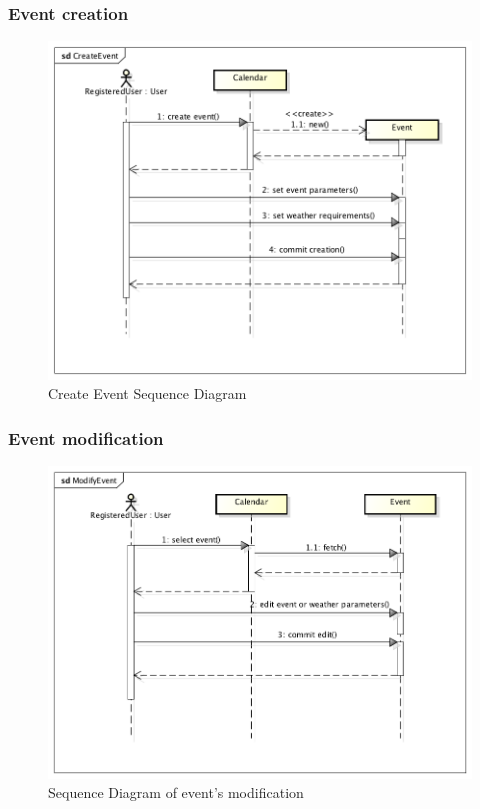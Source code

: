 \subsubsection{Event creation}
\begin{center}
 \begin{figure}[H]
    \includegraphics[width=1\textwidth]{../UMLDiagram/sequence/CreateEvent/CreateEvent.png}
    \caption{Create Event Sequence Diagram}
     \label{fig:createseqdiag}
     \end{figure}
   \end{center}  
\subsubsection{Event modification}
\begin{center}
 \begin{figure}[H]
    \includegraphics[width=1\textwidth]{../UMLDiagram/sequence/ModifyEvent/ModifyEvent.png}
    \caption{Sequence Diagram of event's modification}
     \label{fig:modseqdiag}
     \end{figure}
   \end{center}  
